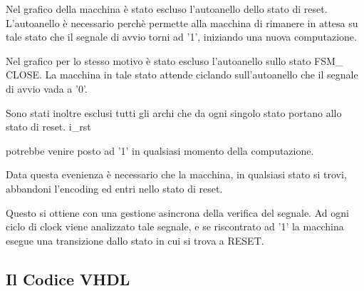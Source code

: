 \documentclass{article}
\newenvironment{gitFont}{\fontfamily{zi4}\selectfont}{\par}
\begin{document}
\begin{flushleft}


Nel grafico della macchina è stato escluso l'autoanello dello stato di reset. L'autoanello è necessario perchè permette alla macchina di rimanere in attesa su tale stato che il segnale di avvio torni ad '1', iniziando una nuova computazione.
\smallskip

Nel grafico per lo stesso motivo è stato escluso l'autoanello sullo stato FSM\_ CLOSE. La macchina in tale stato attende ciclando sull'autoanello che il segnale di avvio vada a '0'.

 Sono stati inoltre esclusi tutti gli archi che da ogni singolo stato portano allo stato di reset.
\begin{gitFont}i{\_}rst \end{gitFont} potrebbe venire posto ad '1' in qualsiasi momento della computazione. 
\smallskip

Data questa evenienza è necessario che la macchina, in qualsiasi stato si trovi, abbandoni l'encoding ed entri nello stato di reset. 
\smallskip

Questo si ottiene con una gestione asincrona della verifica del segnale. 
Ad ogni ciclo di clock viene analizzato tale segnale, e se riscontrato ad '1' la macchina esegue una transizione dallo stato in cui si trova a RESET.

\end{flushleft}

\subsection{Il Codice VHDL}
\end{document}

